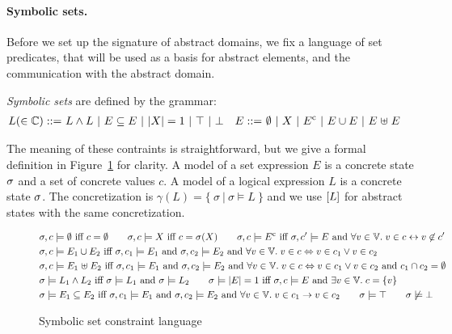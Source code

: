 \paragraph{Symbolic sets.}
Before we set up the signature of abstract domains, we fix a language
of set predicates, that will be used as a basis for abstract elements,
and the communication with the abstract domain.
\begin{definition}
  \label{d:1:symsets}
  {\em Symbolic sets} are defined by the grammar:
  \begin{align*}
    L (\in \mathbb{C}) ::=
    & \ L \wedge L \
    | \ E \subseteq E \
    | \ |{X}| = 1 \
    | \ \top \
    | \ \bot
    & E ::=
    & \ \emptyset \ | \ X \ | \ {E}^{\mathrm{c}} \ | \ E \cup E \ | \ E \mathrel{\uplus} E
  \end{align*}
\end{definition}
The meaning of these contraints is straightforward, but we give a formal
definition in Figure~\ref{f:4:symsets} for clarity.
A model of a set expression $E$ is a concrete state $\sigma$ and a set
of concrete values $c$.
A model of a logical expression $L$ is a concrete state $\sigma$.
The concretization is $\gamma(L) = \{\ \sigma \ |\  \sigma \models L\ \}$
and we use $[{L}]$ for abstract states with the same concretization.
\begin{figure}[t]
  \begin{align*}
    & \sigma, c \models \emptyset \textrm{ iff } c = \emptyset
    \qquad
    \sigma, c \models X \textrm{ iff } c = \sigma(X)
    \qquad \sigma, c \models {E}^{\mathrm{c}}
    \textrm{ iff }
    \sigma, c' \models{E}
    \textrm{ and } \forall v \in \mathbb{V}.
    \; v \in c \leftrightarrow v \not\in c'
    \\
    & \sigma, c \models E_1 \cup E_2
    \textrm{ iff }
    \sigma, c_1 \models E_1
    \textrm{ and } \sigma, c_2 \models E_2
    \textrm{ and }
    \forall v \in \mathbb{V}. \; v \in c \Leftrightarrow v \in c_1 \vee
    v \in c_2
    \\
    & \sigma, c \models E_1 \mathrel{\uplus} E_2
    \textrm{ iff }
    \sigma, c_1 \models E_1
    \textrm{ and } \sigma, c_2 \models E_2
    \textrm{ and }
    \forall v \in \mathbb{V}. \; v \in c \Leftrightarrow v \in c_1 \vee
    v \in c_2
    \textrm{ and } c_1 \cap c_2 = \emptyset
    \\
    & \sigma \models L_1 \wedge L_2
    \textrm{ iff }
    \sigma \models L_1 \textrm{ and } \sigma \models L_2
    \qquad
    \sigma \models |{E}| = 1
    \textrm{ iff }
    \sigma, c \models E \textrm{ and } \exists v \in \mathbb{V}. \; c = \{ v \}
    \\
    & \sigma \models E_1 \subseteq E_2
    \textrm{ iff }
    \sigma, c_1 \models E_1 \textrm{ and } \sigma, c_2 \models E_2
    \textrm{ and } \forall v \in \mathbb{V}. \; v \in c_1 \rightarrow v \in c_2
    \qquad \sigma \models \top
    \qquad \sigma \not\models \bot
  \end{align*}
  \caption{Symbolic set constraint language}
  \label{f:4:symsets}
\end{figure}
